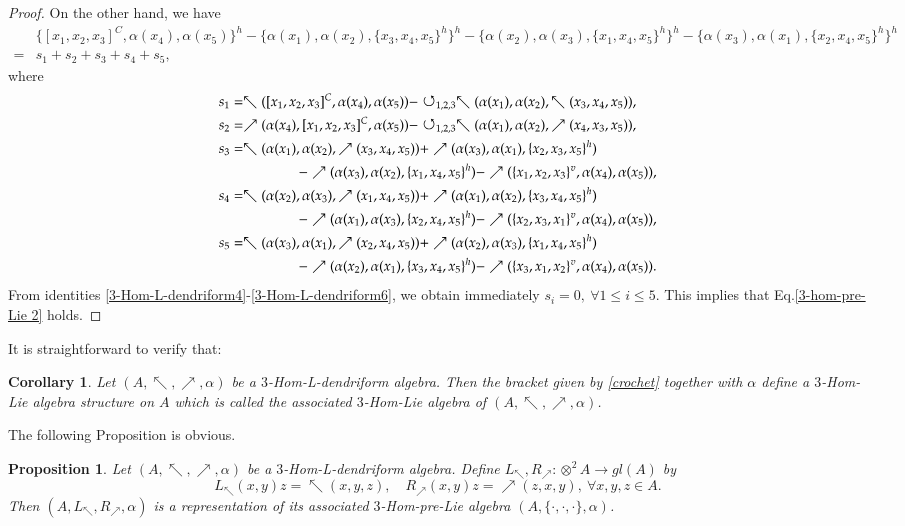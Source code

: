 \documentclass[a4paper,11pt]{article}
\def\c{\cdot}
\def\nw{\nwarrow}
\def\ne{\nearrow}
\newtheorem{cor}[thm]{Corollary}
\newtheorem{pro}[thm]{Proposition}
\theoremstyle{definition}
\begin{document}
\begin{proof}
On the other hand, we have
{\small\begin{align*}
&\{ [x_1,x_2,x_3]^C,\alpha(x_4), \alpha(x_5)\}^h-\{\alpha(x_1),\alpha(x_2),\{ x_3,x_4, x_5\}^h\}^h-\{\alpha(x_2),\alpha(x_3),\{ x_1,x_4,x_5\}^h\}^h -\{\alpha(x_3),\alpha(x_1),\{ x_2,x_4, x_5\}^h\}^h \\
=& s_1+s_2+s_3+s_4+s_5,
\end{align*}}
where
\begin{align*}
&s_1=\nw([x_1,x_2,x_3]^C,\alpha(x_4),\alpha(x_5))-
\circlearrowleft_{1,2,3}\nw(\alpha(x_1),\alpha(x_2),\nw(x_3,x_4,x_5)),\\
&s_2= \ne(\alpha(x_4),[x_1,x_2,x_3]^C,\alpha(x_5))-
\circlearrowleft_{1,2,3}\nw(\alpha(x_1),\alpha(x_2),\ne(x_4,x_3,x_5)) ,\\
&s_3=\nw(\alpha(x_1),\alpha(x_2),\ne(x_3,x_4,x_5))+\ne(\alpha(x_3),\alpha(x_1),\{x_2,x_3,x_5\}^h)\\
&\hspace{2 cm} -\ne(\alpha(x_3),\alpha(x_2),\{x_1,x_4,x_5\}^h)-\ne(\{x_1,x_2,x_3\}^v,\alpha(x_4),\alpha(x_5)),\\
&s_4= \nw(\alpha(x_2),\alpha(x_3),\ne(x_1,x_4,x_5))+\ne(\alpha(x_1),\alpha(x_2),\{x_3,x_4,x_5\}^h)\\
&\hspace{2 cm} -\ne(\alpha(x_1),\alpha(x_3),\{x_2,x_4,x_5\}^h)-\ne(\{x_2,x_3,x_1\}^v,\alpha(x_4),\alpha(x_5)),\\
&s_5=  \nw(\alpha(x_3),\alpha(x_1),\ne(x_2,x_4,x_5))+\ne(\alpha(x_2),\alpha(x_3),\{x_1,x_4,x_5\}^h)\\
&\hspace{2 cm} -\ne(\alpha(x_2),\alpha(x_1),\{x_3,x_4,x_5\}^h)-\ne(\{x_3,x_1,x_2\}^v,\alpha(x_4),\alpha(x_5)).
\end{align*}
From identities \eqref{3-Hom-L-dendriform4}-\eqref{3-Hom-L-dendriform6}, we obtain immediately $s_i=0,\ \forall 1 \leq i \leq 5$.
This implies that Eq.\eqref{3-hom-pre-Lie 2} holds.
\end{proof}
It is straightforward to verify that:
\begin{cor}
Let $(A,\nw,\ne,\alpha)$ be  a $3$-Hom-L-dendriform algebra. Then the bracket given by  \eqref{crochet} together with $\alpha$ define a $3$-Hom-Lie algebra structure on $A$ which is called the associated   $3$-Hom-Lie algebra of  $(A,\nw,\ne,\alpha)$.
\end{cor}
The following Proposition is obvious.
\begin{pro}
Let $(A,\nw,\ne,\alpha)$ be a $3$-Hom-L-dendriform algebra. Define $L_{\nw},R_{\ne}: \otimes^2 A \to gl(A)$ by
$$L_{\nw}(x,y)z=\nw(x,y,z),\quad  R_{\ne}(x,y)z=\ne(z,x,y),\ \forall x,y,z \in A.$$
Then $(A,L_{\nw},R_{\ne},\alpha)$ is a representation of  its  associated   $3$-Hom-pre-Lie algebra $(A,\{\c,\c,\c\},\alpha)$.
\end{pro}
\end{document}
